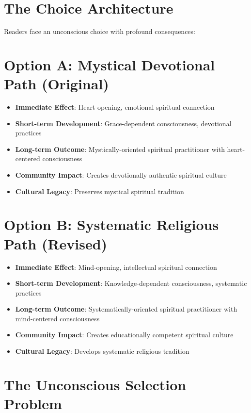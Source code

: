 \documentclass[11pt,twoside]{book}
\begin{document}
\section*{The Choice Architecture}
\label{sec:org421781e}

Readers face an unconscious choice with profound consequences:
\section*{Option A: Mystical Devotional Path (Original)}
\label{sec:orgc63c9df}
\begin{itemize}
\item \textbf{\textbf{Immediate Effect}}: Heart-opening, emotional spiritual connection
\item \textbf{\textbf{Short-term Development}}: Grace-dependent consciousness, devotional practices
\item \textbf{\textbf{Long-term Outcome}}: Mystically-oriented spiritual practitioner with heart-centered consciousness
\item \textbf{\textbf{Community Impact}}: Creates devotionally authentic spiritual culture
\item \textbf{\textbf{Cultural Legacy}}: Preserves mystical spiritual tradition
\end{itemize}
\section*{Option B: Systematic Religious Path (Revised)}
\label{sec:orgebf5451}
\begin{itemize}
\item \textbf{\textbf{Immediate Effect}}: Mind-opening, intellectual spiritual connection
\item \textbf{\textbf{Short-term Development}}: Knowledge-dependent consciousness, systematic practices
\item \textbf{\textbf{Long-term Outcome}}: Systematically-oriented spiritual practitioner with mind-centered consciousness
\item \textbf{\textbf{Community Impact}}: Creates educationally competent spiritual culture
\item \textbf{\textbf{Cultural Legacy}}: Develops systematic religious tradition
\end{itemize}
\section*{The Unconscious Selection Problem}
\label{sec:org899e19c}
\end{document}

